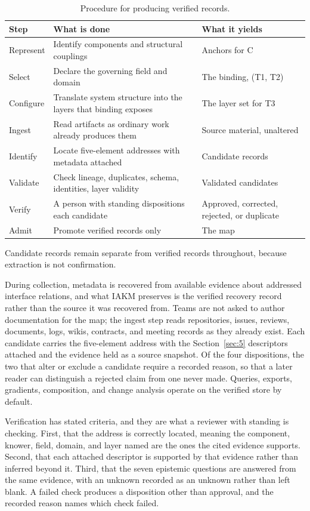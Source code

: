 \documentclass[conference]{IEEEtran}
\begin{document}
\begin{table}[!tb]
\caption{Procedure for producing verified records.}
\label{tab:procedure}
\centering
\scriptsize
\begin{tabularx}{\textwidth}{W{0.5}W{1.35}W{1.15}}
\hline
\textbf{Step} & \textbf{What is done} & \textbf{What it yields} \\
\hline
Represent & Identify components and structural couplings & Anchors for C \\
Select & Declare the governing field and domain & The binding, (T1, T2) \\
Configure & Translate system structure into the layers that binding exposes & The layer set for T3 \\
Ingest & Read artifacts as ordinary work already produces them & Source material, unaltered \\
Identify & Locate five-element addresses with metadata attached & Candidate records \\
Validate & Check lineage, duplicates, schema, identities, layer validity & Validated candidates \\
Verify & A person with standing dispositions each candidate & Approved, corrected, rejected, or duplicate \\
Admit & Promote verified records only & The map \\
\hline
\end{tabularx}
\end{table}

Candidate records remain separate from verified records throughout, because extraction is not confirmation.

During collection, metadata is recovered from available evidence about addressed interface relations, and what IAKM preserves is the verified recovery record rather than the source it was recovered from. Teams are not asked to author documentation for the map; the ingest step reads repositories, issues, reviews, documents, logs, wikis, contracts, and meeting records as they already exist. Each candidate carries the five-element address with the Section~\ref{sec:5} descriptors attached and the evidence held as a source snapshot. Of the four dispositions, the two that alter or exclude a candidate require a recorded reason, so that a later reader can distinguish a rejected claim from one never made. Queries, exports, gradients, composition, and change analysis operate on the verified store by default.

Verification has stated criteria, and they are what a reviewer with standing is checking. First, that the address is correctly located, meaning the component, knower, field, domain, and layer named are the ones the cited evidence supports. Second, that each attached descriptor is supported by that evidence rather than inferred beyond it. Third, that the seven epistemic questions are answered from the same evidence, with an unknown recorded as an unknown rather than left blank. A failed check produces a disposition other than approval, and the recorded reason names which check failed.
\end{document}
